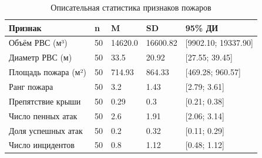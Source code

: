 \begin{table}[htbp]
\centering
\caption{Описательная статистика признаков пожаров}
\label{tab:descriptive}
\begin{tabular}{|l|l|l|l|l|}
\hline
\textbf{Признак} & \textbf{n} & \textbf{M} & \textbf{SD} & \textbf{95\% ДИ} \\
\hline
Объём РВС (м³) & 50 & 14620.0 & 16600.82 & [9902.10; 19337.90] \\
Диаметр РВС (м) & 50 & 33.5 & 20.92 & [27.55; 39.45] \\
Площадь пожара (м²) & 50 & 714.93 & 864.33 & [469.28; 960.57] \\
Ранг пожара & 50 & 3.2 & 1.43 & [2.79; 3.61] \\
Препятствие крыши & 50 & 0.29 & 0.3 & [0.21; 0.38] \\
Число пенных атак & 50 & 2.6 & 1.91 & [2.06; 3.14] \\
Доля успешных атак & 50 & 0.2 & 0.32 & [0.11; 0.29] \\
Число инцидентов & 50 & 0.8 & 1.12 & [0.48; 1.12] \\
\hline
\end{tabular}
\end{table}